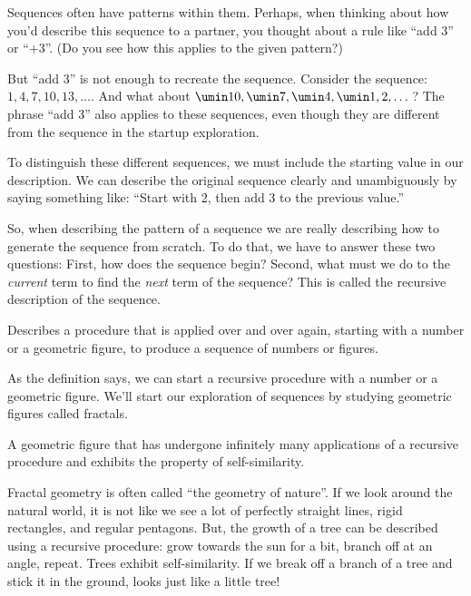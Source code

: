Sequences often have patterns within them. Perhaps, when thinking about how you'd describe this sequence to a partner, you thought about a rule like ``add 3'' or ``+3''. (Do you see how this applies to the given pattern?)

But ``add 3'' is not enough to recreate the sequence. Consider the sequence: $1, 4, 7, 10, 13, \dotsc$. And what about $\umin10, \umin7, \umin4, \umin1, 2, \dotsc$? The phrase ``add 3'' also applies to these sequences, even though they are different from the sequence in the startup exploration.

To distinguish these different sequences, we must include the starting value in our description. We can describe the original sequence clearly and unambiguously by saying something like: ``Start with 2, then add 3 to the previous value.''

So, when describing the pattern of a sequence we are really describing how to generate the sequence from scratch. To do that, we have to answer these two questions: First, how does the sequence begin? Second, what must we do to the \textit{current} term to find the \textit{next} term of the sequence? This is called the \gls{recursive} description of the sequence.

\begin{boxeddef}[Recursive]
Describes a procedure that is applied over and over again, starting with a number or a geometric figure, to produce a sequence of numbers or figures.
\end{boxeddef}

As the definition says, we can start a recursive procedure with a number or a geometric figure. We'll start our exploration of sequences by studying geometric figures called \glspl{fractal}.

\begin{boxeddef}[Fractal]
A geometric figure that has undergone infinitely many applications of a recursive procedure and exhibits the property of self-similarity.
\end{boxeddef}

Fractal geometry is often called ``the geometry of nature''. If we look around the natural world, it is not like we see a lot of perfectly straight lines, rigid rectangles, and regular pentagons. But, the growth of a tree can be described using a recursive procedure: grow towards the sun for a bit, branch off at an angle, repeat. Trees exhibit self-similarity. If we break off a branch of a tree and stick it in the ground, looks just like a little tree!

